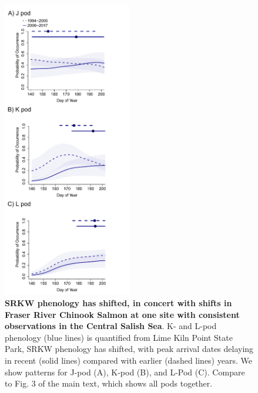 \documentclass{article}
\begin{document}
\newpage
\begin{figure}[!hp]
\includegraphics[width=0.5\textwidth]{../analyses/orcaphen/figures/orcachinphenoverlap_allpods2006_edited.pdf}
\caption{\textbf{SRKW phenology has shifted, in concert with shifts in Fraser River Chinook Salmon at one site with consistent observations in the Central Salish Sea}. K- and L-pod phenology (blue lines) is quantified from Lime Kiln Point State Park, SRKW phenology has shifted, with peak arrival dates delaying in recent (solid lines) compared with earlier (dashed lines) years. We show patterns for J-pod (A), K-pod (B), and L-Pod (C). Compare to Fig. 3 of the main text, which shows all pods together. }
\label{fig:KLchin}
\end{figure}
\end{document}
